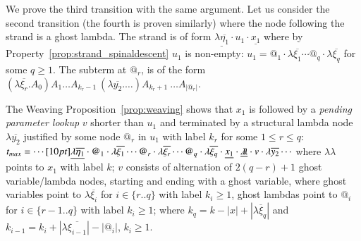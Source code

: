\documentclass{elsarticle}
\theoremstyle{plain}
\theoremstyle{definition}
\newcommand{\ghostlmd}{{\lambda\!\!\lambda}}
\begin{document}
We prove the third transition with the same argument.
Let us consider the second transition (the fourth is proven similarly) where the node following the strand is a ghost lambda. The strand is of form $\underline{\lambda\overline{\eta_1}} \cdot u_1 \cdot \underline{x_1} $ where by Property~\ref{prop:strand_spinaldescent} $u_1$ is  non-empty: $u_1 =
@_1 \cdot\lambda\overline{\xi_1} \cdots @_q\cdot \lambda\overline{\xi_q}$ for some $q\geq 1$. The subterm at $@_r$, is of the form
$(\lambda\overline{\xi_r}. A_0) A_1 \ldots A_{k_{r}-1}\ (\lambda\overline{y_2}. \ldots)A_{k_{r}+1}\ \ldots A_{|@_r|}$.

The Weaving Proposition~\ref{prop:weaving} shows that $x_1$ is followed by a \emph{pending parameter lookup} $v$ shorter than $u_1$ and terminated by a structural lambda node $\lambda\overline{y_2}$ justified by some node $@_r$ in $u_1$ with label $k_r$ for some $1\leq r \leq q$:
$
   t_{max} = \cdots \Pstr[10pt]{
   {\underline{\lambda\overline{\eta_1}}}
   \cdot {@_1}
   \cdot \lambda\overline{\xi_1}
   \cdots %
        {@_r}
   \cdot \lambda\overline{\xi_r}
   \cdots {@_q}
   \cdot\lambda\overline{\xi_q}
   \cdot %
        {\underline{x_1}}
   \cdot %
        {\underline\ghostlmd}
   \cdot v
   \cdot %
        {\lambda\overline{y_2}}
   \cdots }
   $
where
$\ghostlmd$ points to $x_1$ with label $k$;
$v$ consists of alternation of $2(q-r) +1$ ghost variable/lambda nodes, starting and ending with a ghost variable,
where ghost variables point to $\lambda\overline{\xi_i}$ for
$i \in \{ r..q \}$ with label $k_i\geq1$,
ghost lambdas point to $@_i$ for $i \in \{ r-1..q \}$ with label $k_i\geq1$;
where $k_q = k - |x| + |\lambda\overline{\xi}_q|$ and $ k_{i-1} = k_i + |\lambda\overline{\xi_{i-1}}| - |@_i|$, $k_i\geq1$.
\end{document}
